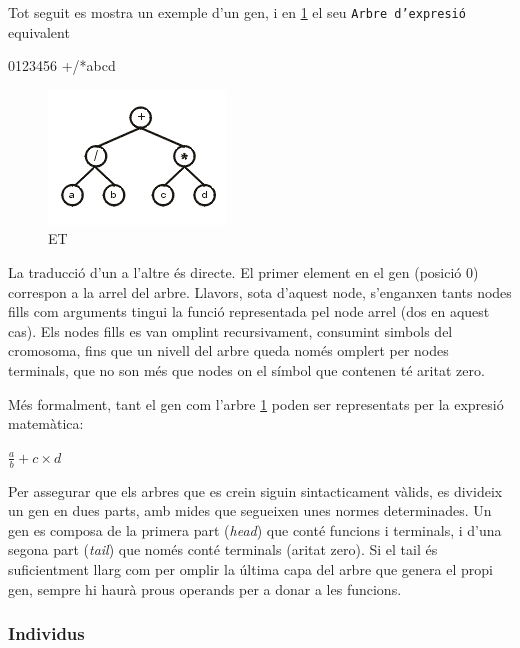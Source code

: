 \documentclass[titlepage,a4paper,12pt]{book}
\begin{document}
Tot seguit es mostra un exemple d'un gen, i en \ref{fig:expression tree1} el seu
\texttt{Arbre d'expresió} equivalent

\begin{center}
0123456    
+/*abcd
\end{center}

\begin{figure}[h]
\begin{center}
\includegraphics{intro/et1.png}
\end{center}
\caption{ET}
\label{fig:expression tree1}
\end{figure}

La traducció d'un a l'altre és directe.  El primer element en el gen (posició
0) correspon a la arrel del arbre.  Llavors, sota d'aquest node, s'enganxen
tants nodes fills com arguments tingui la funció representada pel node arrel
(dos en aquest cas). Els nodes fills es van omplint recursivament, consumint
simbols del cromosoma, fins que un nivell del arbre queda només omplert per
nodes terminals, que no son més que nodes on el símbol que contenen té aritat
zero.

Més formalment, tant el gen com l'arbre \ref{fig:expression tree1} poden ser
representats per la expresió matemàtica:

	$\frac{a}{b}+c \times d$

Per assegurar que els arbres que es crein siguin sintacticament vàlids,
es divideix un gen en dues parts, amb mides que segueixen unes normes
determinades.  Un gen es composa de la primera part (\emph{head}) que conté
funcions i terminals, i d'una segona part (\emph{tail}) que només conté
terminals (aritat zero). Si el tail és suficientment llarg com per omplir la
última capa del arbre que genera el propi gen, sempre hi haurà prous operands
per a donar a les funcions.


\subsubsection{Individus} %
\label{issub:individus}
\end{document}
